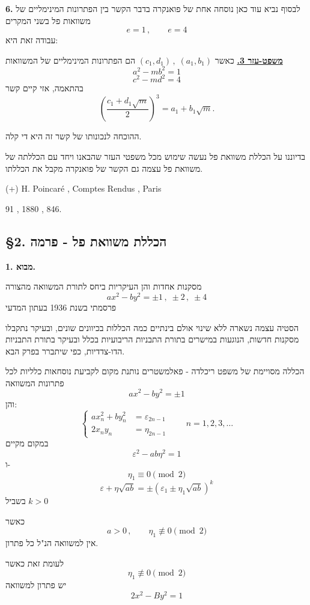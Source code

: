 \noindent\textbf{6.} לבסוף נביא עוד כאן נוסחה אחת של פואנקרה בדבר הקשר בין הפתרונות המינימליים של משוואות פל בשני המקרים
\[ e = 1 \, , \qquad e = 4 \]
עבודה זאת היא:

\bigskip
\noindent\textbf{\underline{משפט-עזר 3.}}
כאשר $(c_1, d_1) \, , \; (a_1, b_1)$
הם הפתרונות המינימליים של המשוואות
\[ a^2 - mb^2 = 1 \]
\[ c^2 - md^2 = 4 \]
בהתאמה, אזי קיים קשר
\[ \left(\frac{c_1 + d_1\sqrt{m}}{2}\right)^3 = a_1 + b_1\sqrt{m} . \]

ההוכחה לנכונותו של קשר זה היא די קלה.

בדיוננו על הכללת משוואת פל נעשה שימוש מכל משפטי העזר שהבאנו ויחד עם הכללתה של משוואת פל עצמה גם הקשר של פואנקרה מקבל את הכללתו.

\bigskip
\noindent (+) \quad H. Poincaré , \quad Comptes Rendus , Paris

\hspace{1.2cm} 91 , 1880 , 846.

\subsection*{\S2. הכללת משוואת פל - פרמה}

\noindent\textbf{1. מבוא.}

מסקנות אחדות והן העיקריות ביחס לתורת המשוואה מהצורה
\[ ax^2 - by^2 = \pm 1 \, , \; \pm 2 \, , \; \pm 4 \]
פרסמתי בשנת 1936 בעתון המדעי

\medskip
\noindent{}

\medskip
הסטיה עצמה נשארה ללא שינוי אולם בינתיים כמה הכללות בכיוונים שונים, ובעיקר נתקבלו מסקנות חדשות, הנוגעות במישרים בתורת התבניות הריבועיות בכלל ובעיקר בתורת התבניות הדו-צדדיות, כפי שיתברר בפרק הבא.

הכללה מסויימת של משפט ריכלדה - פאלמשטרים נותנת מקום לקביעת נוסחאות כלליות לכל פתרונות המשוואה
\[ ax^2 - by^2 = \pm 1 \]
והן:
\[
\left\{
\begin{aligned}
ax_n^2 + by_n^2 &= \varepsilon_{2n-1} \\
2x_ny_n &= \eta_{2n-1}
\end{aligned}
\right.
\qquad n = 1, 2, 3, \ldots
\]
במקום מקיים
\[ \varepsilon^2 - ab\eta^2 = 1 \]
ו-
\[ \eta_1 \equiv 0 \pmod{2} \]
\[ \varepsilon + \eta\sqrt{ab} = \pm(\varepsilon_1 \pm \eta_1\sqrt{ab})^k \]
בשביל $k > 0$

כאשר
\[ a > 0 \, , \qquad \eta_1 \not\equiv 0 \pmod{2} \]
אין למשוואה הנ"ל כל פתרון.

לעומת זאת כאשר
\[ \eta_1 \not\equiv 0 \pmod{2} \]
יש פתרון למשוואה
\[ 2x^2 - By^2 = 1 \]

